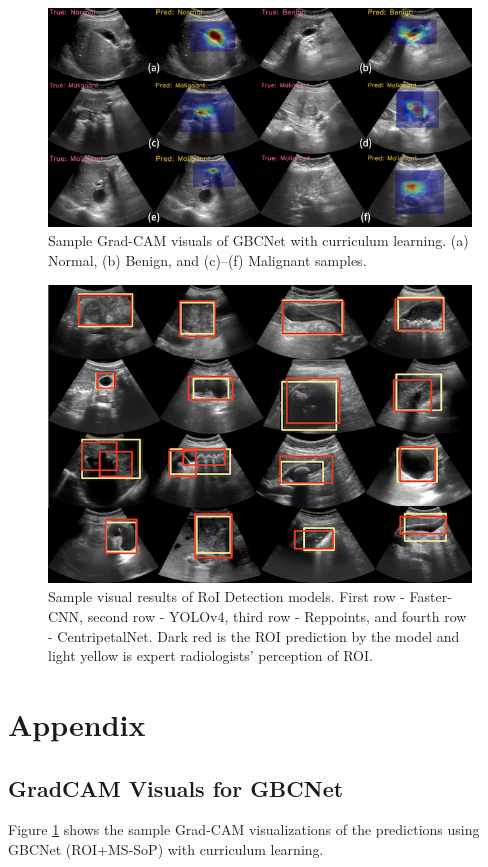 \begin{figure}[t]
	\centering
	\includegraphics[width=0.7\linewidth]{figs/gbcnet/vis-s-1.png}
	\caption[Additional Grad-CAM visuals for GBCNet]{Sample Grad-CAM visuals of GBCNet with curriculum learning. (a) Normal, (b) Benign, and (c)--(f) Malignant samples.}
	\label{fig:supple-2}
\end{figure}

\begin{figure}[t]
	\centering
	\includegraphics[width=0.7\linewidth]{figs/gbcnet/vis-s-0.png}
	\caption[Additional ROI visuals]{Sample visual results of RoI Detection models. First row - Faster-CNN, second row - YOLOv4, third row - Reppoints, and fourth row - CentripetalNet. Dark red is the ROI prediction by the model and light yellow is expert radiologists' perception of ROI.}
	\label{fig:supple-1}
\end{figure}

\section{Appendix}


\subsection{GradCAM Visuals for GBCNet}
\label{supp:cam_vis}
Figure \ref{fig:supple-2} shows the sample Grad-CAM visualizations of the predictions using GBCNet (ROI+MS-SoP) with curriculum learning. %

